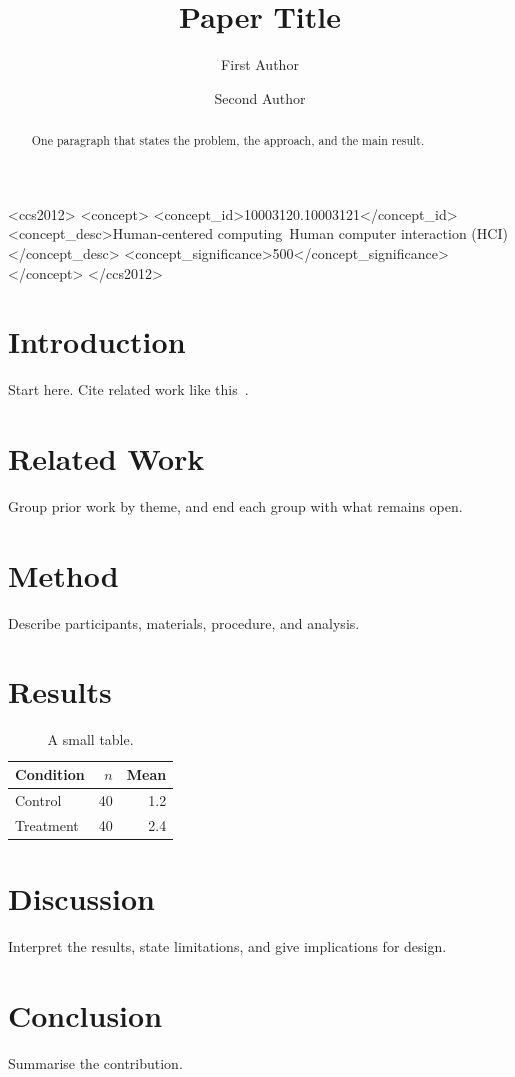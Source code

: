 \documentclass[sigconf,review,anonymous]{acmart}
\begin{document}
\title{Paper Title}

\author{First Author}

\author{Second Author}

\begin{abstract}
One paragraph that states the problem, the approach, and the main result.
\end{abstract}

\begin{CCSXML}
<ccs2012>
   <concept>
       <concept_id>10003120.10003121</concept_id>
       <concept_desc>Human-centered computing~Human computer interaction (HCI)</concept_desc>
       <concept_significance>500</concept_significance>
   </concept>
</ccs2012>
\end{CCSXML}


\maketitle

\section{Introduction}
Start here. Cite related work like this~\cite{knuth1984,lamport1986}.

\section{Related Work}
Group prior work by theme, and end each group with what remains open.

\section{Method}
Describe participants, materials, procedure, and analysis.

\section{Results}
\begin{table}[t]
  \caption{A small table.}
  \label{tab:example}
  \begin{tabular}{lrr}
    \toprule
    Condition & $n$ & Mean \\
    \midrule
    Control   & 40  & 1.2  \\
    Treatment & 40  & 2.4  \\
    \bottomrule
  \end{tabular}
\end{table}

\section{Discussion}
Interpret the results, state limitations, and give implications for design.

\section{Conclusion}
Summarise the contribution.



\end{document}

